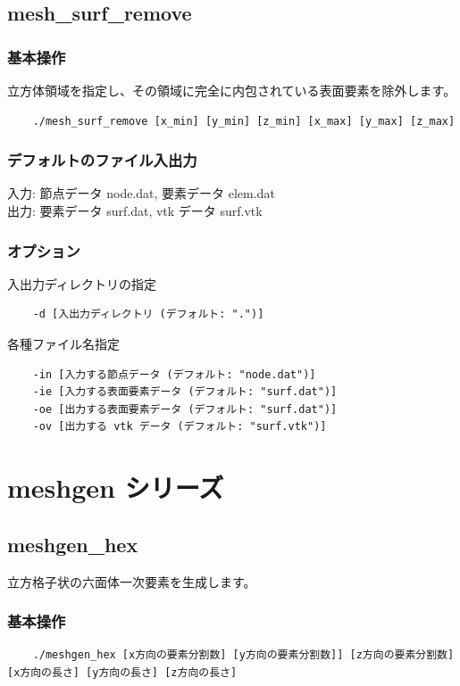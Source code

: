 \documentclass[8pt,a4paper]{article}
\begin{document}
\subsection{mesh\_surf\_remove}
\subsubsection*{基本操作}
立方体領域を指定し、その領域に完全に内包されている表面要素を除外します。
\begin{verbatim}
    ./mesh_surf_remove [x_min] [y_min] [z_min] [x_max] [y_max] [z_max]
\end{verbatim}

\subsubsection*{デフォルトのファイル入出力}
入力: 節点データ node.dat, 要素データ elem.dat \\ \noindent
出力: 要素データ surf.dat, vtk データ surf.vtk

\subsubsection*{オプション}
入出力ディレクトリの指定
\begin{verbatim}
    -d [入出力ディレクトリ (デフォルト: ".")]
\end{verbatim}
各種ファイル名指定
\begin{verbatim}
    -in [入力する節点データ (デフォルト: "node.dat")]
    -ie [入力する表面要素データ (デフォルト: "surf.dat")]
    -oe [出力する表面要素データ (デフォルト: "surf.dat")]
    -ov [出力する vtk データ (デフォルト: "surf.vtk")]
\end{verbatim}


\section{meshgen シリーズ}
\subsection{meshgen\_hex}
立方格子状の六面体一次要素を生成します。
\subsubsection*{基本操作}
\begin{verbatim}
    ./meshgen_hex [x方向の要素分割数] [y方向の要素分割数]] [z方向の要素分割数] [x方向の長さ] [y方向の長さ] [z方向の長さ] 
\end{verbatim}
\end{document}
